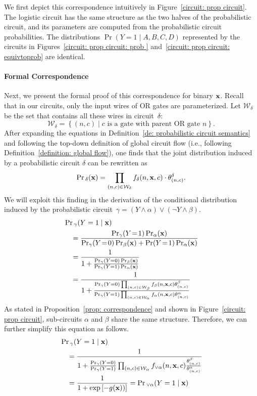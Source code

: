 \documentclass[letterpaper]{article} %
\newcommand{\sample}{{\bf x}}
\begin{document}
We first depict this correspondence intuitively in Figure~\ref{circuit: prop circuit}. The logistic circuit has the same structure as the two halves of the probabilistic circuit, and its parameters are computed from the probabilistic circuit probabilities. The distributions $\Pr(Y=1 \mid A,B,C,D)$ represented by the circuits in Figures~\ref{circuit: prop circuit: prob } and~\ref{circuit: prop circuit: equivtoprob} are identical.

\paragraph{Formal Correspondence}
Next, we present the formal proof of this correspondence for binary $\sample$.
Recall that in our circuits, only the input wires of OR gates are parameterized. Let $\mathcal{W}_\delta$ be the set that contains all these wires in circuit~$\delta$: $$\mathcal{W}_\delta = \left\{(n, c) \mid c\text{ is a gate with parent OR gate } n \right\}.$$
After expanding the equations in Definition~\ref{de: probabilistic circuit semantics} and following the top-down definition of global circuit flow (i.e., following Definition~\ref{definition: global flow}), one finds that the joint distribution induced by a probabilistic circuit $\delta$ can be rewritten as
$$
\Pr{_\delta}(\sample) = \prod_{(n, c) \in \mathcal{W}_\delta} f_\delta(n,\sample,c) \cdot \theta_{(n,c)}^\delta.
$$
We will exploit this finding in the derivation of the conditional distribution induced by the probabilistic circuit~$\gamma = (Y \land \alpha) \lor (\neg Y \land \beta)$.
\begin{align}
&\Pr{_{\gamma}}(Y=1 \mid \sample) \nonumber \\
&\quad =\frac{\Pr_\gamma(Y\!=\!1)\Pr_\alpha(\sample)}{\Pr_\gamma(Y\!=\!0)\Pr_\beta(\sample) + \Pr(Y\!=\!1)\Pr_\alpha(\sample)} \nonumber\\
&\quad = \frac{1}{1+\frac{\Pr_{\gamma}(Y=0)\Pr_\beta(\sample)}{\Pr_{\gamma}(Y=1)\Pr_\alpha(\sample)}} \nonumber \\
&\quad =\frac{1}{1+\frac{\Pr_{\gamma}(Y=0)\prod_{(n,c) \in \mathcal{W}_\beta} f_\beta(n,\sample,c)\theta_{(n,c)}^\beta}{\Pr_{\gamma}(Y=1)\prod_{(n,c) \in \mathcal{W}_\alpha} f_\alpha(n,\sample,c)\theta^\alpha_{(n,c)}}} \nonumber
\end{align}  As stated in Proposition~\ref{prop: correspondence} and shown in Figure~\ref{circuit: prop circuit}, sub-circuits $\alpha$ and $\beta$ share the same structure. Therefore, we can further simplify this equation as follows.
\begin{align}
&\Pr{_{\gamma}}(Y=1 \mid \sample) \nonumber \\
&\quad = \frac{1}{1+\frac{\Pr_{\gamma}(Y=0)}{\Pr_{\gamma}(Y=1)}\prod_{(n,c) \in \mathcal{W}_{\alpha} } f_{\lor \alpha}(n, \sample, c) \frac{\theta^\beta_{(n,c)}}{\theta^\alpha_{(n,c)}} }  \nonumber
\\
&\quad = \frac{1}{1+\exp\left[- g(\sample)) \right]} = \Pr{_{\lor \alpha}}(Y=1 \mid \sample) \nonumber
\end{align}
\end{document}
